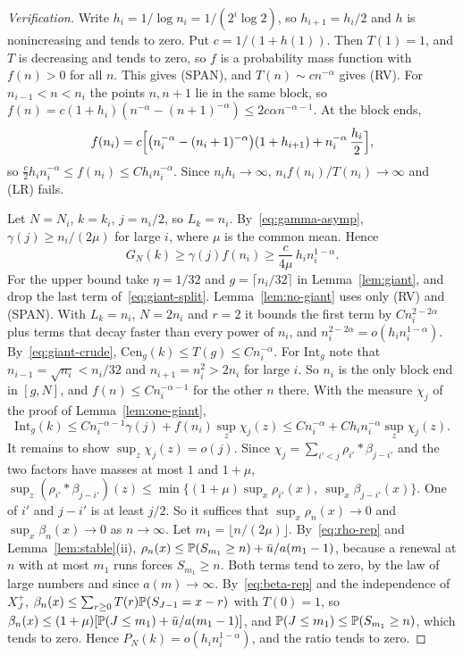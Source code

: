 \begin{proof}[Verification]
Write $h_i=1/\log n_i=1/(2^i\log2)$, so $h_{i+1}=h_i/2$ and $h$ is nonincreasing
and tends to zero. Put $c=1/(1+h(1))$. Then $T(1)=1$, and $T$ is decreasing and tends to
zero, so $f$ is a probability mass function with $f(n)>0$ for all $n$. This gives
(SPAN), and $T(n)\sim cn^{-\alpha}$ gives (RV). For $n_{i-1}<n<n_i$ the points
$n,n+1$ lie in the same block, so $f(n)=c(1+h_i)(n^{-\alpha}-(n+1)^{-\alpha})\le2c\alpha n^{-\alpha-1}$.
At the block ends,
\[
 f(n_i)=c\Bigl[\bigl(n_i^{-\alpha}-(n_i+1)^{-\alpha}\bigr)(1+h_{i+1})+n_i^{-\alpha}\,\frac{h_i}2\Bigr],
\]
so $\frac c2h_in_i^{-\alpha}\le f(n_i)\le Ch_in_i^{-\alpha}$. Since $n_ih_i\to\infty$,
$n_if(n_i)/T(n_i)\to\infty$ and (LR) fails.

Let $N=N_i$, $k=k_i$, $j=n_i/2$, so $L_k=n_i$. By~\eqref{eq:gamma-asymp},
$\gamma(j)\ge n_i/(2\mu)$ for large $i$, where $\mu$ is the common mean. Hence
\[
 G_N(k)\ge\gamma(j)f(n_i)\ge\frac{c}{4\mu}\,h_in_i^{1-\alpha}.
\]
For the upper bound take $\eta=1/32$ and $g=\lceil n_i/32\rceil$ in
Lemma~\ref{lem:giant}, and drop the last term of~\eqref{eq:giant-split}.
Lemma~\ref{lem:no-giant} uses only (RV) and (SPAN). With $L_k=n_i$, $N=2n_i$ and
$r=2$ it bounds the first term by $Cn_i^{2-2\alpha}$ plus terms that decay faster
than every power of $n_i$, and $n_i^{2-2\alpha}=o(h_in_i^{1-\alpha})$.
By~\eqref{eq:giant-crude}, $\mathrm{Cen}_g(k)\le T(g)\le Cn_i^{-\alpha}$. For
$\mathrm{Int}_g$ note that $n_{i-1}=\sqrt{n_i}<n_i/32$ and $n_{i+1}=n_i^2>2n_i$ for large $i$.
So $n_i$ is the only block end in $[g,N]$, and $f(n)\le Cn_i^{-\alpha-1}$ for the
other $n$ there. With the measure $\chi_j$ of the proof of Lemma~\ref{lem:one-giant},
\[
 \mathrm{Int}_g(k)\le Cn_i^{-\alpha-1}\gamma(j)+f(n_i)\sup_z\chi_j(z)\le Cn_i^{-\alpha}+Ch_in_i^{-\alpha}\sup_z\chi_j(z).
\]
It remains to show $\sup_z\chi_j(z)=o(j)$. Since $\chi_j=\sum_{i'<j}\rho_{i'}*\beta_{j-i'}$
and the two factors have masses at most $1$ and $1+\mu$,
$\sup_z(\rho_{i'}*\beta_{j-i'})(z)\le\min\{(1+\mu)\sup_x\rho_{i'}(x),\ \sup_x\beta_{j-i'}(x)\}$.
One of $i'$ and $j-i'$ is at least $j/2$. So it suffices that
$\sup_x\rho_n(x)\to0$ and $\sup_x\beta_n(x)\to0$ as $n\to\infty$. Let $m_1=\lfloor n/(2\mu)\rfloor$.
By~\eqref{eq:rho-rep} and Lemma~\ref{lem:stable}(ii),
$\rho_n(x)\le\mathbb{P}(S_{m_1}\ge n)+\bar u/a(m_1-1)$, because a renewal at $n$ with at most
$m_1$ runs forces $S_{m_1}\ge n$. Both terms tend to zero, by the law of large numbers
and since $a(m)\to\infty$. By~\eqref{eq:beta-rep} and the independence of $X^\plus_J$,
$\beta_n(x)\le\sum_{r\ge0}T(r)\mathbb{P}(S_{J-1}=x-r)$ with $T(0)=1$, so
$\beta_n(x)\le(1+\mu)[\mathbb{P}(J\le m_1)+\bar u/a(m_1-1)]$, and
$\mathbb{P}(J\le m_1)\le\mathbb{P}(S_{m_1}\ge n)$, which tends to zero. Hence
$P_N(k)=o(h_in_i^{1-\alpha})$, and the ratio tends to zero.
\end{proof}

